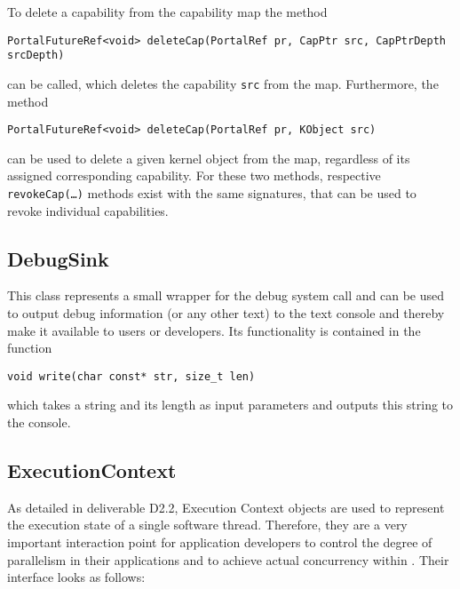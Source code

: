 To delete a capability from the capability map the method
\lstset{language=c++,numbers=none}
\begin{lstlisting}
PortalFutureRef<void> deleteCap(PortalRef pr, CapPtr src, CapPtrDepth srcDepth)
\end{lstlisting}
\noindent can be called, which deletes the capability \texttt{src} from the
map. Furthermore, the method
\lstset{language=c++,numbers=none}
\begin{lstlisting}
PortalFutureRef<void> deleteCap(PortalRef pr, KObject src)
\end{lstlisting}
\noindent can be used to delete a given kernel object from the map,
regardless of its assigned corresponding capability. For these two methods,
respective \texttt{revokeCap(\ldots)} methods exist with the same signatures, that can
be used to revoke individual capabilities.

\subsection{DebugSink}
This class represents a small wrapper for the debug system call and can be used
to output debug information (or any other text) to the text console and thereby
make it available to users or developers. Its functionality is contained in the
function
\lstset{language=c++,numbers=none}
\begin{lstlisting}
void write(char const* str, size_t len)
\end{lstlisting}
\noindent which takes a string
and its length as input parameters and outputs this string to the console.

\subsection{ExecutionContext}
As detailed in deliverable D2.2, Execution Context objects are used to
represent the execution state of a single software thread. Therefore, they are a
very important interaction point for application developers to control the
degree of parallelism in their applications and to achieve actual concurrency
within \mythos. Their interface looks as follows:

